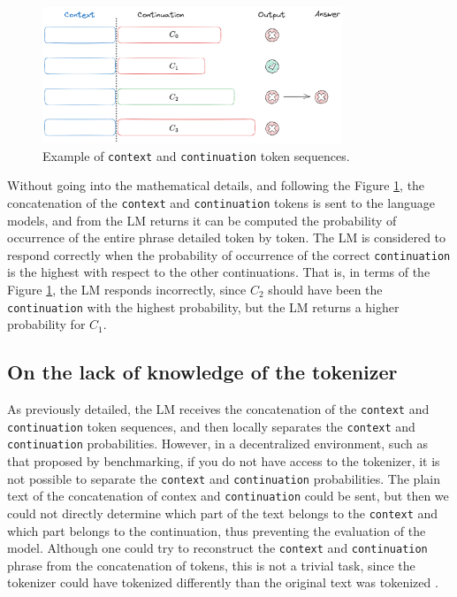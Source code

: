 \begin{figure}[h]
    \centering
    \includegraphics[width=0.8\textwidth]{img/loglikelihood_example.png}
    \caption{Example of \texttt{context} and \texttt{continuation} token sequences.}
    \label{fig:loglikelihood_example}
\end{figure}

Without going into the mathematical details, and following the Figure \ref{fig:loglikelihood_example}, the concatenation of the \texttt{context} and \texttt{continuation} tokens is sent to the language models, and from the \gls{LM} returns it can be computed the probability of occurrence of the entire phrase detailed token by token. 
The \gls{LM} is considered to respond correctly when the probability of occurrence of the correct \texttt{continuation} is the highest with respect to the other continuations. That is, in terms of the Figure \ref{fig:loglikelihood_example}, the \gls{LM} responds incorrectly, since $C_2$ should have been the \texttt{continuation} with the highest probability, but the \gls{LM} returns a higher probability for $C_1$. 

\subsection{On the lack of knowledge of the tokenizer}\label{subsec:b2}

As previously detailed, the \gls{LM} receives the concatenation of the \texttt{context} and \texttt{continuation} token sequences, and then locally separates the \texttt{context} and \texttt{continuation} probabilities. 
However, in a decentralized environment, such as that proposed by benchmarking, if you do not have access to the tokenizer, it is not possible to separate the \texttt{context} and \texttt{continuation} probabilities. 
The plain text of the concatenation of contex and \texttt{continuation} could be sent, but then we could not directly determine which part of the text belongs to the \texttt{context} and which part belongs to the continuation, thus preventing the evaluation of the model. 
Although one could try to reconstruct the \texttt{context} and \texttt{continuation} phrase from the concatenation of tokens, this is not a trivial task, since the tokenizer could have tokenized differently than the original text was tokenized \cite{biderman_lessons_2024}. 

